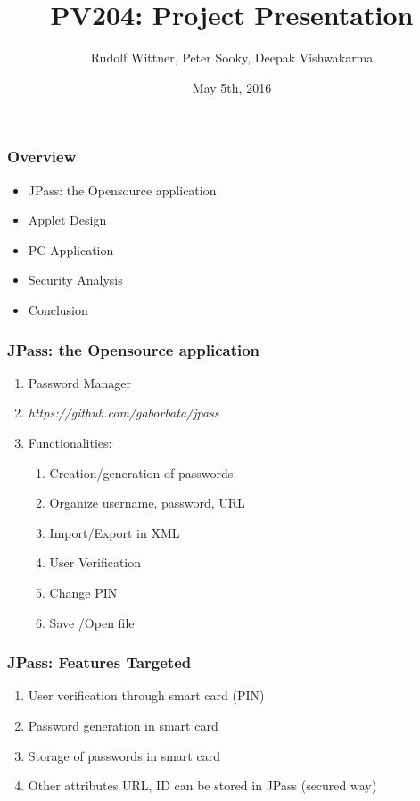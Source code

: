 \documentclass{beamer}
\title[JPass]{PV204: Project Presentation}
\author[RPD]{Rudolf Wittner, Peter Sooky, Deepak  Vishwakarma}
\institute[MU]{Faculty of Informatics, MU}
\date{May 5th, 2016}
\begin{document}
  \maketitle


  \begin{frame}
    \frametitle{Overview}
     \begin{itemize}	
      \item JPass: the Opensource application
      \item Applet Design
      \item PC Application
      \item Security Analysis
      \item  Conclusion
     \end{itemize}
  \end{frame}
  
  \begin{frame}
    \frametitle{JPass: the Opensource application}
    \begin{enumerate}
    	\item Password Manager
    	\item \emph{https://github.com/gaborbata/jpass}
	\item Functionalities:
	\begin{enumerate} [-]
		\item Creation/generation of passwords
		\item Organize username, password, URL
		\item Import/Export in XML
		\item User Verification
		\item Change PIN
		\item Save /Open file
	\end{enumerate}	
     \end{enumerate}  
  \end{frame}

  \begin{frame}
    \frametitle{JPass: Features Targeted}
    \begin{enumerate}
    	\item User verification through smart card (PIN)
	\item Password generation in smart card
	\item Storage of passwords in smart card
	\item Other attributes URL, ID can be stored in JPass (secured way)
     \end{enumerate}  
  \end{frame}
  
\end{document}
